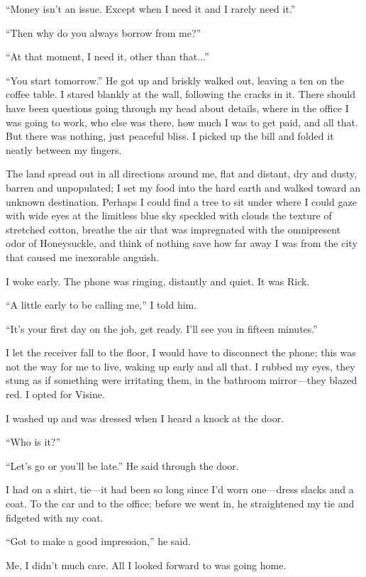 ``Money isn't an issue. Except when I need it and I rarely need it.''

``Then why do you always borrow from me?''

``At that moment, I need it, other than that...''

``You start tomorrow.'' He got up and briskly walked out, leaving a ten
on the coffee table. I stared blankly at the wall, following the cracks
in it. There should have been questions going through my head about
details, where in the office I was going to work, who else was there,
how much I was to get paid, and all that. But there was nothing, just
peaceful bliss. I picked up the bill and folded it neatly between my
fingers.

The land spread out in all directions around me, flat and distant, dry
and dusty, barren and unpopulated; I set my food into the hard earth and
walked toward an unknown destination. Perhaps I could find a tree to sit
under where I could gaze with wide eyes at the limitless blue sky
speckled with clouds the texture of stretched cotton, breathe the air
that was impregnated with the omnipresent odor of Honeysuckle, and think
of nothing save how far away I was from the city that caused me
inexorable anguish.

I woke early. The phone was ringing, distantly and quiet. It was Rick.

``A little early to be calling me,'' I told him.

``It's your first day on the job, get ready. I'll see you in fifteen
minutes.''

I let the receiver fall to the floor, I would have to disconnect the
phone; this was not the way for me to live, waking up early and all
that. I rubbed my eyes, they stung as if something were irritating them,
in the bathroom mirror---they blazed red. I opted for Visine.

I washed up and was dressed when I heard a knock at the door.

``Who is it?''

``Let's go or you'll be late.'' He said through the door.

I had on a shirt, tie---it had been so long since I'd worn one---dress
slacks and a coat. To the car and to the office; before we went in, he
straightened my tie and fidgeted with my coat.

``Got to make a good impression,'' he said.

Me, I didn't much care. All I looked forward to was going home.

